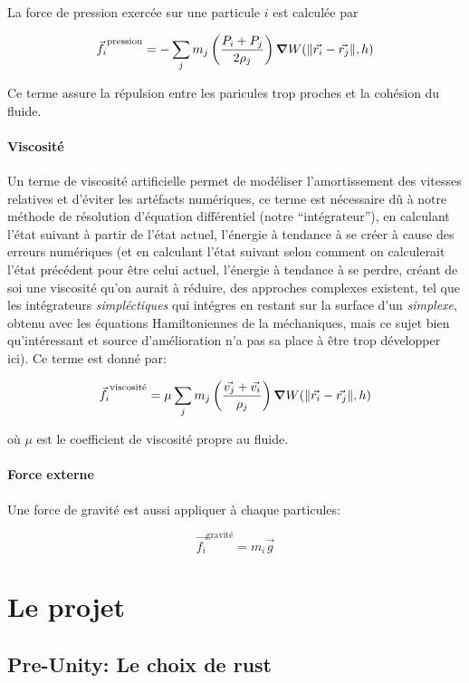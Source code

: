 \documentclass{article}
\begin{document}
La force de pression exercée sur une particule \(i\) est calculée par

\[
    \vec{f_i}^\text{pression} = - \sum_j m_j \left ( \frac{P_i + P_j}{2\rho_j}\right ) \grad W(\norm{\vec{r_i} - \vec{r_j}}, h)
\]

Ce terme assure la répulsion entre les paricules trop proches et la cohésion du fluide.

\paragraph{Viscosité}

Un terme de viscosité artificielle permet de modéliser l'amortissement des vitesses relatives et d'éviter les artéfacts numériques, ce terme est nécessaire dû à notre méthode de résolution d'équation différentiel (notre ``intégrateur''), en calculant l'état suivant à partir de l'état actuel, l'énergie à tendance à se créer à cause des erreurs numériques (et en calculant l'état suivant selon comment on calculerait l'état précédent pour être celui actuel, l'énergie à tendance à se perdre, créant de soi une viscosité qu'on aurait à réduire, des approches complexes existent, tel que les intégrateurs {\emph {simpléctiques}} qui intégres en restant sur la surface d'un {\emph {simplexe}}, obtenu avec les équations Hamiltoniennes de la méchaniques, mais ce sujet bien qu'intéressant et source d'amélioration n'a pas sa place à être trop développer ici). Ce terme est donné par:

\[
    \vec{f_i}^\text{viscosité} = \mu \sum_j m_j \left ( \frac{\vec{v_j} + \vec{v_i}}{\rho_j}\right ) \grad W(\norm{\vec{r_i} - \vec{r_j}}, h)
\]

où \(\mu\) est le coefficient de viscosité propre au fluide.

\paragraph{Force externe}

Une force de gravité est aussi appliquer à chaque particules:

\[
    \vec{f_i}^\text{gravité} = m_i \vec{g}
\]

\section{Le projet}

\subsection{Pre-Unity: Le choix de rust}
\end{document}
